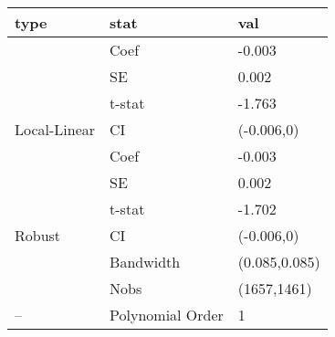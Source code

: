 
\begin{tabular}{lll}
\toprule
type & stat & val\\
\midrule
 & Coef & -0.003\\

 & SE & 0.002\\

 & t-stat & -1.763\\

\multirow{-4}{*}{\raggedright\arraybackslash Local-Linear} & CI & (-0.006,0)\\
\cmidrule{1-3}
 & Coef & -0.003\\

 & SE & 0.002\\

 & t-stat & -1.702\\

\multirow{-4}{*}{\raggedright\arraybackslash Robust} & CI & (-0.006,0)\\
\cmidrule{1-3}
 & Bandwidth & (0.085,0.085)\\

 & Nobs & (1657,1461)\\

\multirow{-3}{*}{\raggedright\arraybackslash --} & Polynomial Order & 1\\
\bottomrule
\end{tabular}